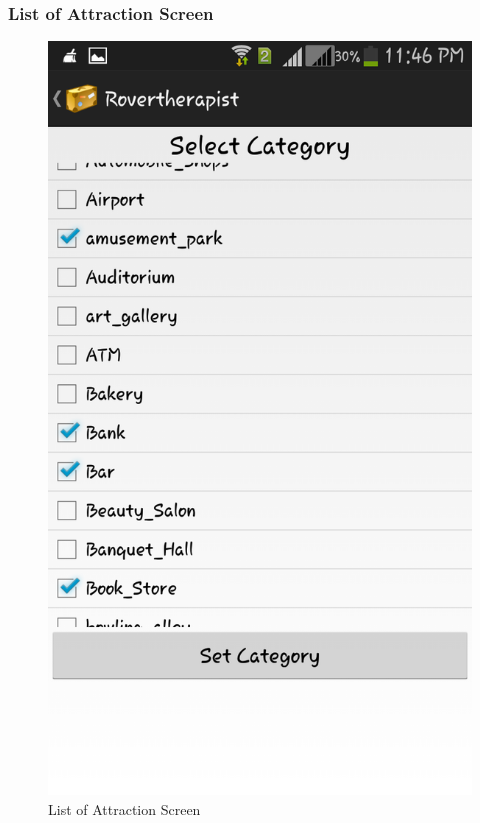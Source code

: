 \documentclass[12pt,a4paper]{article}
\begin{document}
\subsubsection{List of Attraction Screen}
\begin{figure}[!htb]
\centering
\includegraphics[width=12 cm]{attraction}
\caption{List of Attraction Screen}
\end{figure}
\\
\end{document}
